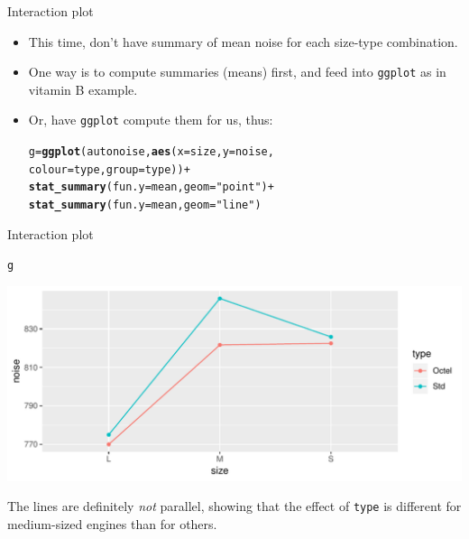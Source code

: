 \documentclass[unknownkeysallowed]{beamer}\usepackage[]{graphicx}\usepackage[]{color}
\makeatletter
\def\maxwidth{ %
  \ifdim\Gin@nat@width>\linewidth
    \linewidth
  \else
    \Gin@nat@width
  \fi
}
\newcommand{\hlstr}[1]{\textcolor[rgb]{0.192,0.494,0.8}{#1}}%
\newcommand{\hlopt}[1]{\textcolor[rgb]{0,0,0}{#1}}%
\newcommand{\hlstd}[1]{\textcolor[rgb]{0.345,0.345,0.345}{#1}}%
\newcommand{\hlkwb}[1]{\textcolor[rgb]{0.69,0.353,0.396}{#1}}%
\newcommand{\hlkwc}[1]{\textcolor[rgb]{0.333,0.667,0.333}{#1}}%
\newcommand{\hlkwd}[1]{\textcolor[rgb]{0.737,0.353,0.396}{\textbf{#1}}}%
\newenvironment{kframe}{%
 \def\at@end@of@kframe{}%
 \ifinner\ifhmode%
  \def\at@end@of@kframe{\end{minipage}}%
  \begin{minipage}{\columnwidth}%
 \fi\fi%
 \def\FrameCommand##1{\hskip\@totalleftmargin \hskip-\fboxsep
 \colorbox{shadecolor}{##1}\hskip-\fboxsep
     \hskip-\linewidth \hskip-\@totalleftmargin \hskip\columnwidth}%
 \MakeFramed {\advance\hsize-\width
   \@totalleftmargin\z@ \linewidth\hsize
   \@setminipage}}%
 {\par\unskip\endMakeFramed%
 \at@end@of@kframe}
\newenvironment{knitrout}{}{} %
\makeatother
\begin{document}
\begin{frame}[fragile]{Interaction plot}
  
  \begin{itemize}
  \item This time, don't have summary of mean noise for each size-type
    combination. 
  \item One way is to compute summaries (means) first, and feed into
    \texttt{ggplot} as in vitamin B example.
  \item Or, have \texttt{ggplot} compute them for us, thus:
    
\begin{knitrout}
\color{fgcolor}\begin{kframe}
\begin{alltt}
\hlstd{g}\hlkwb{=}\hlkwd{ggplot}\hlstd{(autonoise,}\hlkwd{aes}\hlstd{(}\hlkwc{x}\hlstd{=size,}\hlkwc{y}\hlstd{=noise,}
    \hlkwc{colour}\hlstd{=type,}\hlkwc{group}\hlstd{=type))}\hlopt{+}
  \hlkwd{stat_summary}\hlstd{(}\hlkwc{fun.y}\hlstd{=mean,}\hlkwc{geom}\hlstd{=}\hlstr{"point"}\hlstd{)}\hlopt{+}
  \hlkwd{stat_summary}\hlstd{(}\hlkwc{fun.y}\hlstd{=mean,}\hlkwc{geom}\hlstd{=}\hlstr{"line"}\hlstd{)}
\end{alltt}
\end{kframe}
\end{knitrout}
  \end{itemize}
  
\end{frame}

\begin{frame}[fragile]{Interaction plot}
  
\begin{knitrout}
\color{fgcolor}\begin{kframe}
\begin{alltt}
\hlstd{g}
\end{alltt}
\end{kframe}
\includegraphics[width=\maxwidth]{figure/unnamed-chunk-176-1} 

\end{knitrout}

The lines are definitely \emph{not} parallel, showing that the effect
of \texttt{type} is different for medium-sized engines than for others.
  
\end{frame}
\end{document}
